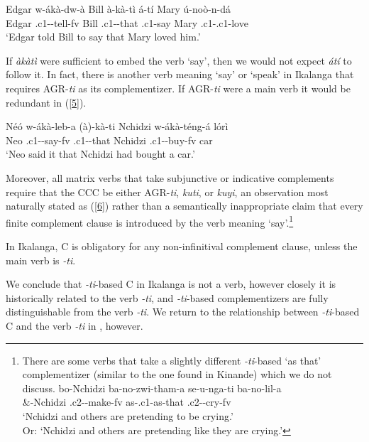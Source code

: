 \documentclass[output=paper,
modfonts
]{langscibook}
\begin{document}
\ea \gll Edgar w-ákà-dw-à  Bill à-kà-tì  á-tí  Mary 	ú-noò-n-dá\\
        Edgar .c1--tell-fv Bill .c1--that .c1-say Mary  .c1-.c1-love\\
       \glt `Edgar told Bill to say that Mary loved him.'
       \z 
       
If \textit{àkàtì} were sufficient to embed the verb `say', then we would not expect \textit{átí} to follow it. In fact, there is another verb meaning `say' or `speak' in Ikalanga that requires AGR-\textit{ti} as its complementizer. If AGR-\textit{ti} were a main verb it would be redundant in (\ref{5}).

\ea\label{5} \gll Néó w-ákà-leb-a    (à)-kà-ti  Nchidzi w-ákà-téng-á  lórì\\
         Neo .c1--say-fv  .c1--that Nchidzi .c1--buy-fv car\\
     \glt `Neo said it that Nchidzi had bought a car.'
            \z
            
Moreover, all matrix verbs that take subjunctive or indicative complements require that the CCC be either AGR-\textit{ti}, \textit{kuti}, or \textit{kuyi}, an observation most naturally stated as (\ref{6}) rather than a semantically inappropriate claim that every finite complement clause is introduced by the verb meaning `say'.\footnote{There are some verbs that take a slightly different \textit{-ti}-based `as that' complementizer (similar to the one found in Kinande) which we do not discuss.
\ea \gll bo-Nchidzi  ba-no-zwi-tham-a  se-u-nga-ti	  ba-no-lil-a\\
      \&-Nchidzi   .c2--make-fv  as-.c1-as-that  .c2--cry-fv\\
     \glt `Nchidzi and others are pretending to be crying.' \\
     Or: `Nchidzi and others are pretending like they are crying.'\z}  

\ea \label{6}
\textup{In Ikalanga, C is obligatory for any non-infinitival complement clause, unless the 	main verb is} \textit{-ti}.
\z

We conclude that \textit{-ti}-based C in Ikalanga is not a verb, however closely it is historically related to the verb \textit{-ti}, and \textit{-ti}-based complementizers are fully distinguishable from the verb \textit{-ti}. We return to the relationship between \textit{-ti}-based C and the verb \textit{-ti} in , however. 
\end{document}
